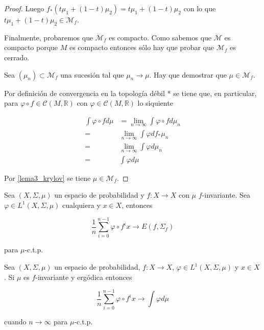 \begin{proof}
	Luego $f_*(t\mu_1 + (1-t)\mu_2) = t\mu_1 + (1-t)\mu_2$ con lo que $t\mu_1 + (1-t)\mu_2 \in \mathcal{M}_f$.
	
	Finalmente, probaremos que $\mathcal{M}_f$ es compacto. Como sabemos que $\mathcal{M}$ es compacto porque $M$ es compacto entonces sólo hay que probar que $\mathcal{M}_f$ es cerrado.
	
	Sea $(\mu_n) \subset \mathcal{M}_f$ una sucesión tal que $\mu_n \rightarrow \mu$. Hay que demostrar que $\mu \in \mathcal{M}_f$.
	
	Por definición de convergencia en la topología débil * se tiene que, en particular, para $\varphi \circ f \in \mathcal{C}(M,\mathbb{R})$ con $\varphi \in \mathcal{C}(M,\mathbb{R})$ lo siquiente
	
	\begin{align}
	\int \varphi \circ f d\mu &= \lim_{n \rightarrow \infty} \int \varphi \circ f d\mu_n\\
	=& \lim_{n \rightarrow \infty} \int \varphi df_*\mu_n\\
	=& \lim_{n \rightarrow \infty} \int \varphi d\mu_n\\
	=& \int \varphi d\mu
	\end{align}
	
	Por \ref{lema3_krylov} se tiene $\mu \in \mathcal{M}_f$.
\end{proof}

\begin{lema}
	Sea $(X,\Sigma,\mu)$ un espacio de probabilidad y $f: X \rightarrow X$ con $\mu$ $f$-invariante. Sea $\varphi \in L^1(X,\Sigma,\mu)$ cualquiera y $x \in X$, entonces
	
	\begin{equation}
		\frac{1}{n} \sum_{i=0}^{n-1} \varphi \circ f^i x \rightarrow E(f,\Sigma_f)
	\end{equation}
	
	para $\mu$-c.t.p.
	
\end{lema}

\begin{teorema}\label{birkhoff_thm}
	Sea $(X,\Sigma,\mu)$ un espacio de probabilidad, $f: X \rightarrow X$, $\varphi \in L^1(X,\Sigma,\mu)$ y $x \in X$. Si $\mu$ es $f$-invariante y ergódica entonces
	
	\begin{equation}
		\frac{1}{n} \sum_{i=0}^{n-1} \varphi \circ f^i x \rightarrow \int \varphi d\mu
	\end{equation}
	
	cuando $n \rightarrow \infty$ para $\mu$-c.t.p.
\end{teorema}